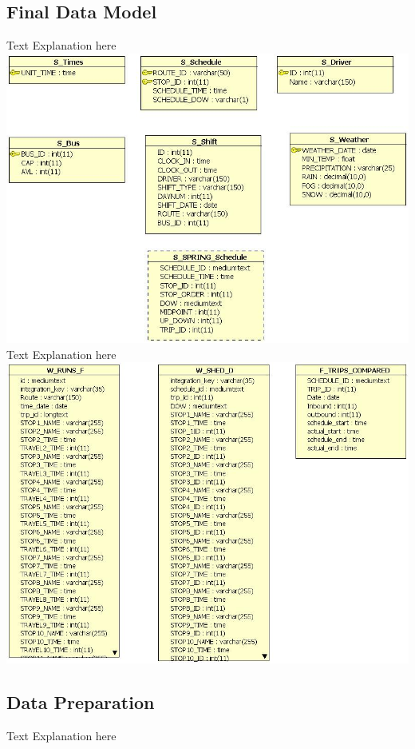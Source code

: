 \documentclass[12pt]{article}
\begin{document}
\subsection{Final Data Model}
Text Explanation here\\
\includegraphics[scale=0.5]{resources/Source_spring}\\[1cm] 
Text Explanation here\\
\includegraphics[scale=0.5]{resources/wh}\\[1cm] 
\subsection{Data Preparation}
Text Explanation here\\
\end{document}
